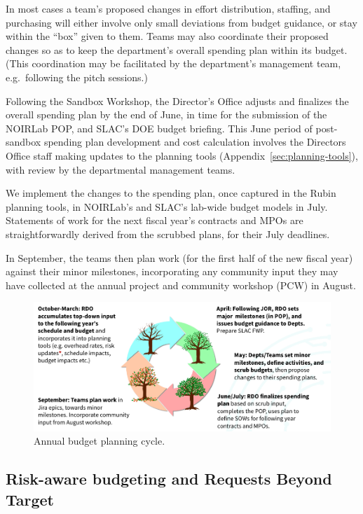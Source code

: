 In most cases a team's proposed changes in effort distribution, staffing, and purchasing will either involve only small deviations from budget guidance, or stay within the ``box'' given to them.
Teams may also coordinate their proposed changes so as to keep the department's overall spending plan within its budget.
(This coordination may be facilitated by the department's management team, e.g.\ following the pitch sessions.)

Following the Sandbox Workshop, the \gls{Director}'s Office adjusts and finalizes the overall spending plan by the end of June, in time for the submission of the NOIRLab \gls{POP}, and \gls{SLAC}'s DOE budget briefing.
This June period of post-sandbox spending plan development and cost calculation involves the Directors Office staff making updates to the planning tools (Appendix~\ref{sec:planning-tools}), with review by the departmental management teams.

We implement the changes to the spending plan, once captured in the Rubin planning tools, in \gls{NOIRLab}'s and \gls{SLAC}'s lab-wide budget models in July.
Statements of work for the next fiscal year's contracts and MPOs are straightforwardly derived from the scrubbed plans, for their July deadlines.

In September, the teams then plan work (for the first half of the new fiscal year) against their minor milestones, incorporating any community input they may have collected at the annual project and community workshop (\gls{PCW}) in August.

\begin{figure}[!ht]
\includegraphics[width=0.95\linewidth]{figures/annual-budget-cycle.png}
\caption{Annual budget planning \gls{cycle}.}
\label{fig:annual-cycle}
\end{figure}


\subsection{Risk-aware budgeting and Requests Beyond Target}

